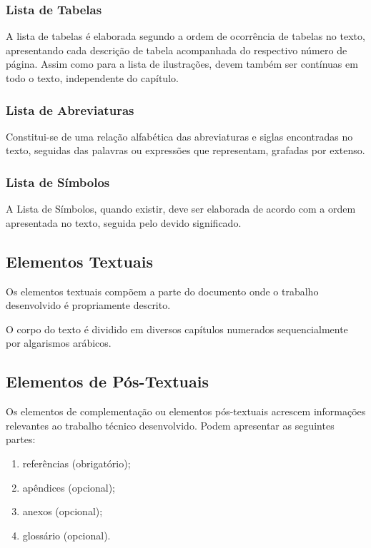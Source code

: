 \documentclass[repeatfields,xlists,xpacks,oneside,yearsonly]{ufrgscca}
\begin{document}
\subsubsection{Lista de Tabelas}

A lista de tabelas é elaborada segundo a ordem de ocorrência de tabelas no
texto, apresentando cada descrição de tabela acompanhada do respectivo
número de página. Assim como para a lista de ilustrações, devem também ser
contínuas em todo o texto, independente do capítulo.


\subsubsection{Lista de Abreviaturas}

Constitui-se de uma relação alfabética das abreviaturas e siglas encontradas
no texto, seguidas das palavras ou expressões que representam, grafadas por
extenso.

\subsubsection{Lista de Símbolos}

A Lista de Símbolos, quando existir, deve ser elaborada de acordo  com a
ordem apresentada no texto, seguida pelo devido significado.

\subsection{Elementos Textuais}

Os elementos textuais compõem a parte do documento onde o trabalho
desenvolvido é propriamente descrito.

O corpo do texto é dividido em diversos capítulos numerados sequencialmente
por algarismos arábicos.

\subsection{Elementos de Pós-Textuais}

Os elementos de complementação ou elementos pós-textuais acrescem
informações relevantes ao trabalho técnico desenvolvido. Podem apresentar as
seguintes partes:

\begin{enumerate}
\item referências (obrigatório);
\item apêndices (opcional);
\item anexos (opcional);
\item glossário (opcional).
\end{enumerate}
\end{document}
